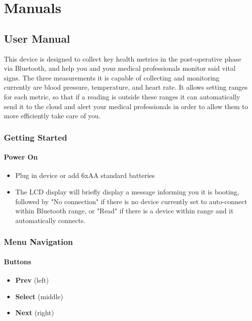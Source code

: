 \chapter*{Manuals}

\section*{User Manual}
This device is designed to collect key health metrics in the post-operative phase via Bluetooth, and help you and your medical professionals monitor said vital signs. The three measurements it is capable of collecting and monitoring currently are blood pressure, temperature, and heart rate. It allows setting ranges for each metric, so that if a reading is outside these ranges it can automatically send it to the cloud and alert your medical professionals in order to allow them to more efficiently take care of you.

\subsection{Getting Started}
\subsubsection{Power On}
\begin{itemize}
	\item Plug in device or add 6xAA standard batteries
	\item The LCD display will briefly display a message informing you it is booting, followed by "No connection" if there is no device currently set to auto-connect within Bluetooth range, or "Read" if there is a device within range and it automatically connects.
\end{itemize}

\subsection{Menu Navigation}
\subsubsection{Buttons}
\begin{itemize}
	\item \textbf{Prev} (left)
	\item \textbf{Select} (middle)
	\item \textbf{Next} (right)
\end{itemize}

